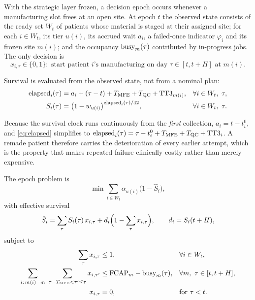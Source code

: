 With the strategic layer frozen, a decision epoch occurs whenever a
manufacturing slot frees at an open site. At epoch $t$ the observed state
consists of the ready set $W_t$ of patients whose material is staged at their
assigned site; for each $i \in W_t$, its tier $u(i)$, its accrued wait $a_i$, a
failed-once indicator $\varphi_i$ and its frozen site $m(i)$; and the occupancy
$\mathrm{busy}_m(\tau)$ contributed by in-progress jobs. The only decision is
\[
  x_{i,\tau} \in \{0,1\}: \text{ start patient } i\text{'s manufacturing on day }
  \tau \in [t, t+H] \text{ at } m(i).
\]

Survival is evaluated from the observed state, not from a nominal plan:
\begin{align}
  \mathrm{elapsed}_i(\tau) &= a_i + (\tau - t) + T_{\mathrm{MFE}} + T_{\mathrm{QC}} + \mathrm{TT3}_{m(i)},
      & &\forall i \in W_t,\ \tau, \label{eq:elapsed}\\
  S_i(\tau) &= \bigl(1 - w_{u(i)}\bigr)^{\mathrm{elapsed}_i(\tau)/42},
      & &\forall i \in W_t,\ \tau. \label{eq:sitau}
\end{align}

Because the survival clock runs continuously from the \emph{first} collection,
$a_i = t - t^{0}_{i}$, and \eqref{eq:elapsed} simplifies to $\mathrm{elapsed}_i(\tau) =
\tau - t^{0}_{i} + T_{\mathrm{MFE}} + T_{\mathrm{QC}} + \mathrm{TT3}_i$. A remade patient therefore
carries the deterioration of every earlier attempt, which is the property that
makes repeated failure clinically costly rather than merely expensive.

The epoch problem is
\begin{equation}
  \min \sum_{i \in W_t} \alpha_{u(i)} \bigl(1 - \hat{S}_i\bigr), \label{eq:epochobj}
\end{equation}
with effective survival
\begin{equation}
  \hat{S}_i = \sum_{\tau} S_i(\tau)\,x_{i,\tau}
              + d_i\Bigl(1 - \sum_{\tau} x_{i,\tau}\Bigr),
  \qquad d_i = S_i(t+H), \label{eq:shat}
\end{equation}
subject to
\begin{align}
  \sum_{\tau} x_{i,\tau} &\le 1, & &\forall i \in W_t, \label{eq:once}\\
  \sum_{i:\, m(i)=m} \ \sum_{\tau-T_{\mathrm{MFE}} < \tau' \le \tau} x_{i,\tau'}
      &\le \mathrm{FCAP}_m - \mathrm{busy}_m(\tau), & &\forall m,\ \tau \in [t, t+H],
      \label{eq:epochcap}\\
  x_{i,\tau} &= 0, & &\text{for } \tau < t. \label{eq:noearly}
\end{align}

